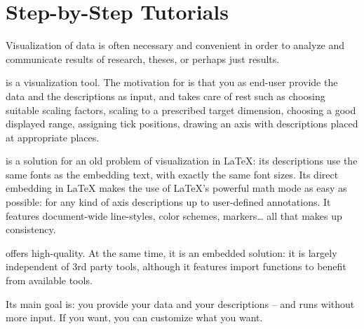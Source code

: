 
\part[tutorials]{Step-by-Step Tutorials}
{%
%


Visualization of data is often necessary and convenient in order to analyze and
communicate results of research, theses, or perhaps just results.

\PGFPlots{} is a visualization tool. The motivation for \PGFPlots{} is that you
as end-user provide the data and the descriptions as input, and \PGFPlots{}
takes care of rest such as choosing suitable scaling factors, scaling to a
prescribed target dimension, choosing a good displayed range, assigning tick
positions, drawing an axis with descriptions placed at appropriate places.

\PGFPlots{} is a solution for an old problem of visualization in \LaTeX{}: its
descriptions use the same fonts as the embedding text, with exactly the same
font sizes. Its direct embedding in \LaTeX{} makes the use of \LaTeX{}'s
powerful math mode as easy as possible: for any kind of axis descriptions up to
user-defined annotations. It features document-wide line-styles, color schemes,
markers\ldots{} all that makes up consistency.

\PGFPlots{} offers high-quality. At the same time, it is an embedded solution:
it is largely independent of 3rd party tools, although it features import
functions to benefit from available tools.

Its main goal is: you provide your data and your descriptions -- and
\PGFPlots{} runs without more input. If you want, you can customize what you
want.






}%
